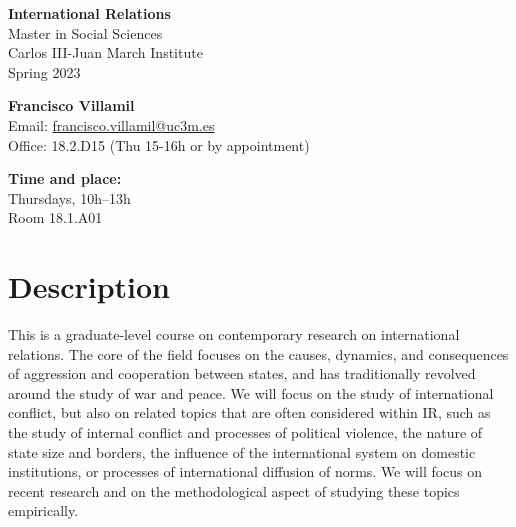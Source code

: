 \documentclass[12pt, a4paper]{article}
\begin{document}
\begin{center}
{\LARGE\bf International Relations}\\\vspace{10pt}
Master in Social Sciences\\Carlos III-Juan March Institute\\
\vspace{10pt}
{\large Spring 2023}\\
\end{center}

\vspace{15pt}

\begin{minipage}{0.6\textwidth}
\textbf{Francisco Villamil}\\
Email: \href{francisco.villamil@uc3m.es}{francisco.villamil@uc3m.es}\\
Office: 18.2.D15 (Thu 15-16h or by appointment)
\end{minipage}\hfill
\begin{minipage}{0.39\textwidth}
\centering
\textbf{Time and place:}\\
Thursdays, 10h--13h\\Room 18.1.A01
\end{minipage}


\section{Description}

This is a graduate-level course on contemporary research on international relations. The core of the field focuses on the causes, dynamics, and consequences of aggression and cooperation between states, and has traditionally revolved around the study of war and peace.
We will focus on the study of international conflict, but also on related topics that are often considered within IR, such as the study of internal conflict and processes of political violence, the nature of state size and borders, the influence of the international system on domestic institutions, or processes of international diffusion of norms.
We will focus on recent research and on the methodological aspect of studying these topics empirically.
\end{document}

